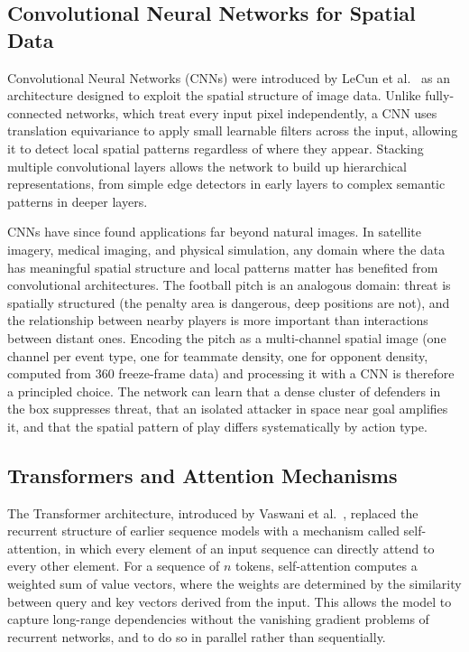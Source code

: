\documentclass{article}
\begin{document}
\subsection{Convolutional Neural Networks for Spatial Data}

Convolutional Neural Networks (CNNs) were introduced by LeCun et al.\ \cite{lecun1998} as an architecture designed to exploit the spatial structure of image data. Unlike fully-connected networks, which treat every input pixel independently, a CNN uses translation equivariance to apply small learnable filters across the input, allowing it to detect local spatial patterns regardless of where they appear. Stacking multiple convolutional layers allows the network to build up hierarchical representations, from simple edge detectors in early layers to complex semantic patterns in deeper layers.

CNNs have since found applications far beyond natural images. In satellite imagery, medical imaging, and physical simulation, any domain where the data has meaningful spatial structure and local patterns matter has benefited from convolutional architectures. The football pitch is an analogous domain: threat is spatially structured (the penalty area is dangerous, deep positions are not), and the relationship between nearby players is more important than interactions between distant ones. Encoding the pitch as a multi-channel spatial image (one channel per event type, one for teammate density, one for opponent density, computed from 360 freeze-frame data) and processing it with a CNN is therefore a principled choice. The network can learn that a dense cluster of defenders in the box suppresses threat, that an isolated attacker in space near goal amplifies it, and that the spatial pattern of play differs systematically by action type.

\subsection{Transformers and Attention Mechanisms}

The Transformer architecture, introduced by Vaswani et al.\ \cite{vaswani2017}, replaced the recurrent structure of earlier sequence models with a mechanism called self-attention, in which every element of an input sequence can directly attend to every other element. For a sequence of $n$ tokens, self-attention computes a weighted sum of value vectors, where the weights are determined by the similarity between query and key vectors derived from the input. This allows the model to capture long-range dependencies without the vanishing gradient problems of recurrent networks, and to do so in parallel rather than sequentially.
\end{document}
